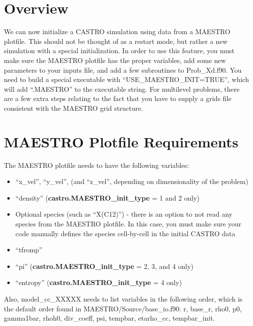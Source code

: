 \section{Overview}
We can now initialize a CASTRO simulation using data from a MAESTRO plotfile.  This should not be thought of as a restart mode, but rather a new simulation with a special initialization.  In order to use this feature, you must make sure the MAESTRO plotfile has the proper variables, add some new parameters to your inputs file, and add a few subroutines to Prob\_Xd.f90.  You need to build a special executable with ``USE\_MAESTRO\_INIT=TRUE'', which will add ``.MAESTRO'' to the executable string.  For multilevel problems, there are a few extra steps relating to the fact that you have to supply a grids file consistent with the MAESTRO grid structure.

\section{MAESTRO Plotfile Requirements}
The MAESTRO plotfile needs to have the following variables:
\begin{itemize}
\item ``x\_vel'', ``y\_vel'', (and ``z\_vel'', depending on dimensionality of the problem)
\item ``density'' ({\bf castro.MAESTRO\_init\_type} = 1 and 2 only)
\item Optional species (such as ``X(C12)'') - there is an option to not read any species from the MAESTRO plotfile.  In this case, you must make sure your code manually defines the species cell-by-cell in the initial CASTRO data
\item ``tfromp''
\item ``pi'' ({\bf castro.MAESTRO\_init\_type} = 2, 3, and 4 only)
\item ``entropy'' ({\bf castro.MAESTRO\_init\_type} = 4 only)
\end{itemize}
Also, model\_cc\_XXXXX needs to list variables in the following order, which is the default order found in MAESTRO/Source/base\_io.f90:
r, base\_r, rho0, p0, gamma1bar, rhoh0, div\_coeff, psi, tempbar, etarho\_cc, tempbar\_init.

